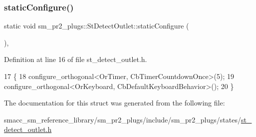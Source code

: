 \subsubsection{\texorpdfstring{static\+Configure()}{staticConfigure()}}
{\footnotesize\ttfamily static void sm\+\_\+pr2\+\_\+plugs\+::\+St\+Detect\+Outlet\+::static\+Configure (\begin{DoxyParamCaption}{ }\end{DoxyParamCaption})\hspace{0.3cm}{\ttfamily [inline]}, {\ttfamily [static]}}



Definition at line 16 of file st\+\_\+detect\+\_\+outlet.\+h.


\begin{DoxyCode}
17     \{
18         configure\_orthogonal<OrTimer,  CbTimerCountdownOnce>(5);    
19         configure\_orthogonal<OrKeyboard, CbDefaultKeyboardBehavior>();
20     \}
\end{DoxyCode}


The documentation for this struct was generated from the following file\+:\begin{DoxyCompactItemize}
\item 
smacc\+\_\+sm\+\_\+reference\+\_\+library/sm\+\_\+pr2\+\_\+plugs/include/sm\+\_\+pr2\+\_\+plugs/states/\hyperlink{st__detect__outlet_8h}{st\+\_\+detect\+\_\+outlet.\+h}\end{DoxyCompactItemize}
